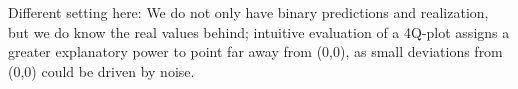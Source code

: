 \documentclass[oneside]{article}
\theoremstyle{plain}%
\theoremstyle{definition}
\newcommand{\ind}[1]{\mathbbm{1}\{#1\}}
\newcommand{\ydiff}{D y}
\newcommand{\ydifft}{Dy^\star}
\newcommand{\xdiff}{Dx}
\newcommand{\xdifft}{Dx^\star}
\newcommand{\Ber}{\text{Ber}}
\newcommand{\cond}{\:\lvert\:}
\begin{document}
Different setting here: We do not only have binary predictions and realization, but we do know the real values behind; intuitive evaluation of a 4Q-plot assigns a greater explanatory power to point far away from (0,0), as small deviations from (0,0) could be driven by noise.




\end{document}
